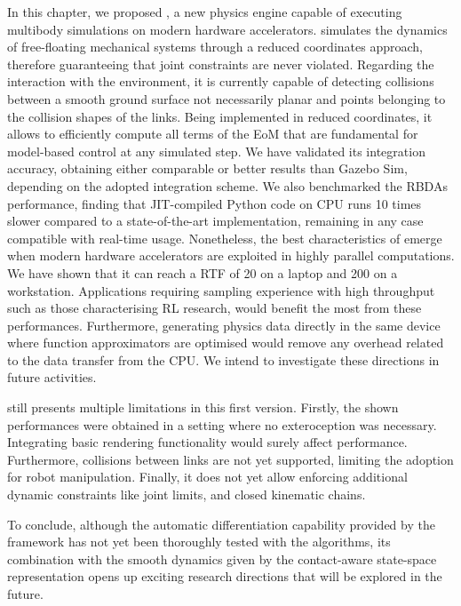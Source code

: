 In this chapter, we proposed \jaxsim, a new physics engine capable of executing multibody simulations on modern hardware accelerators.
\jaxsim simulates the dynamics of free-floating mechanical systems through a reduced coordinates approach, therefore guaranteeing that joint constraints are never violated.
Regarding the interaction with the environment, it is currently capable of detecting collisions between a smooth ground surface not necessarily planar and points belonging to the collision shapes of the links.
Being implemented in reduced coordinates, it allows to efficiently compute all terms of the \ac{EoM} that are fundamental for model-based control at any simulated step.
We have validated its integration accuracy, obtaining either comparable or better results than Gazebo Sim, depending on the adopted integration scheme.
We also benchmarked the \acp{RBDA} performance, finding that \ac{JIT}-compiled Python code on \ac{CPU} runs 10 times slower compared to a state-of-the-art \cpp implementation, remaining in any case compatible with real-time usage.
Nonetheless, the best characteristics of \jaxsim emerge when modern hardware accelerators are exploited in highly parallel computations.
We have shown that it can reach a \ac{RTF} of 20 on a laptop and 200 on a workstation.
Applications requiring sampling experience with high throughput such as those characterising \ac{RL} research, would benefit the most from these performances.
Furthermore, generating physics data directly in the same device where function approximators are optimised would remove any overhead related to the data transfer from the \ac{CPU}.
We intend to investigate these directions in future activities.

\jaxsim still presents multiple limitations in this first version.
Firstly, the shown performances were obtained in a setting where no exteroception was necessary.
Integrating basic rendering functionality would surely affect performance.
Furthermore, collisions between links are not yet supported, limiting the adoption for robot manipulation.
Finally, it does not yet allow enforcing additional dynamic constraints like joint limits, and closed kinematic chains.

To conclude, although the automatic differentiation capability provided by the \jax framework has not yet been thoroughly tested with the \jaxsim algorithms, its combination with the smooth dynamics given by the contact-aware state-space representation opens up exciting research directions that will be explored in the future.
